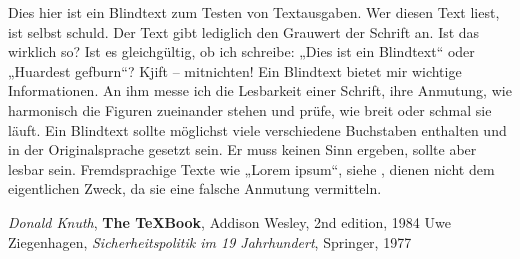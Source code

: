 \documentclass[12pt,ngerman]{scrartcl}
\begin{document}
\blindtext

Dies hier ist ein Blindtext zum Testen von Textausgaben. Wer diesen Text liest, ist selbst schuld. Der Text gibt lediglich den Grauwert der Schrift an. Ist das wirklich so? Ist es gleichgültig, ob ich schreibe: „Dies ist ein Blindtext“ oder „Huardest gefburn“? Kjift – mitnichten! Ein Blindtext bietet mir wichtige Informationen. An ihm messe ich die Lesbarkeit einer Schrift, ihre Anmutung, wie harmonisch die Figuren zueinander stehen und prüfe, wie breit oder schmal sie läuft. Ein Blindtext sollte möglichst viele verschiedene Buchstaben enthalten und in der Originalsprache gesetzt sein. Er muss keinen Sinn ergeben, sollte aber lesbar sein. Fremdsprachige Texte wie „Lorem ipsum“, siehe \cite{knuth}, dienen nicht dem eigentlichen Zweck, da sie eine falsche Anmutung vermitteln.

\begin{thebibliography}{9}
 \textit{Donald Knuth}, \textbf{The \TeX Book}, Addison Wesley, 2nd edition, 1984
 Uwe Ziegenhagen, \textit{Sicherheitspolitik im 19 Jahrhundert}, Springer, 1977
\end{thebibliography}
\end{document}
